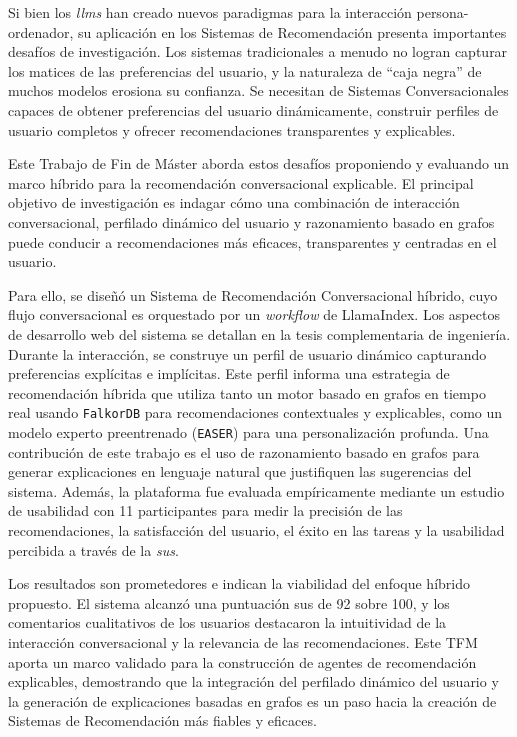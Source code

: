Si bien los \textit{\acp{llm}} han creado nuevos paradigmas para la interacción persona-ordenador, su aplicación en los Sistemas de Recomendación presenta importantes desafíos de investigación. Los sistemas tradicionales a menudo no logran capturar los matices de las preferencias del usuario, y la naturaleza de ``caja negra'' de muchos modelos erosiona su confianza. Se necesitan de Sistemas Conversacionales capaces de obtener preferencias del usuario dinámicamente, construir perfiles de usuario completos y ofrecer recomendaciones transparentes y explicables.

Este Trabajo de Fin de Máster aborda estos desafíos proponiendo y evaluando un marco híbrido para la recomendación conversacional explicable. El principal objetivo de investigación es indagar cómo una combinación de interacción conversacional, perfilado dinámico del usuario y razonamiento basado en grafos puede conducir a recomendaciones más eficaces, transparentes y centradas en el usuario.

Para ello, se diseñó un Sistema de Recomendación Conversacional híbrido, cuyo flujo conversacional es orquestado por un \textit{workflow} de LlamaIndex. Los aspectos de desarrollo web del sistema se detallan en la tesis complementaria de ingeniería. Durante la interacción, se construye un perfil de usuario dinámico capturando preferencias explícitas e implícitas. Este perfil informa una estrategia de recomendación híbrida que utiliza tanto un motor basado en grafos en tiempo real usando \texttt{FalkorDB} para recomendaciones contextuales y explicables, como un modelo experto preentrenado (\texttt{EASER}) para una personalización profunda. Una contribución de este trabajo es el uso de razonamiento basado en grafos para generar explicaciones en lenguaje natural que justifiquen las sugerencias del sistema. Además, la plataforma fue evaluada empíricamente mediante un estudio de usabilidad con 11 participantes para medir la precisión de las recomendaciones, la satisfacción del usuario, el éxito en las tareas y la usabilidad percibida a través de la \textit{\ac{sus}}.

Los resultados son prometedores e indican la viabilidad del enfoque híbrido propuesto. El sistema alcanzó una puntuación \acs{sus} de 92 sobre 100, y los comentarios cualitativos de los usuarios destacaron la intuitividad de la interacción conversacional y la relevancia de las recomendaciones. Este TFM aporta un marco validado para la construcción de agentes de recomendación explicables, demostrando que la integración del perfilado dinámico del usuario y la generación de explicaciones basadas en grafos es un paso hacia la creación de Sistemas de Recomendación más fiables y eficaces.


\newpage